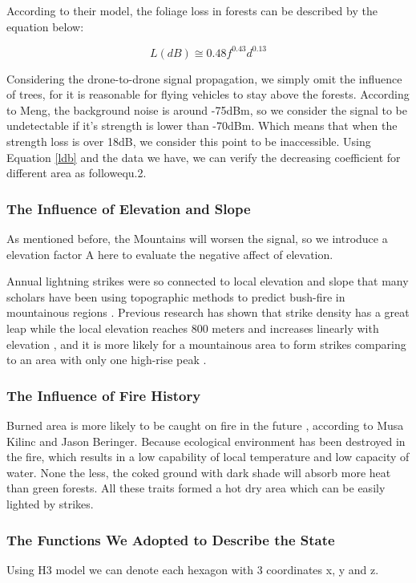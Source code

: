 \documentclass[13pt]{ctexart} %
\begin{document}
According to their model, the foliage loss in forests can be described by the equation below:

\begin{equation}\label{ldb}
    L(dB)\cong 0.48 f^{0.43} d^{0.13}
\end{equation}

Considering the drone-to-drone signal propagation, we simply omit the influence of trees, for it is reasonable for flying vehicles to stay above the forests. According to Meng, the background noise is around -75dBm, so we consider the signal to be undetectable if it's strength is lower than -70dBm. Which means that when the strength loss is over 18dB, we consider this point to be inaccessible. Using Equation \eqref{ldb} and the data we have, we can verify the decreasing coefficient for different area as follow{equ.2}.

\subsubsection{The Influence of Elevation and Slope}
As mentioned before, the Mountains will worsen the signal, so we introduce a elevation factor A here to evaluate the negative affect of elevation.

Annual lightning strikes were so connected to local elevation and slope that many scholars have been using topographic methods to predict bush-fire in mountainous regions \cite{Jiao-wildfire-cn}. Previous research has shown that strike density has a great leap while the local elevation reaches 800 meters and increases linearly with elevation \cite{Musa-lightning02}, and it is more likely for a mountainous area to form strikes comparing to an area with only one high-rise peak \cite{Jiao-wildfire-cn}.


\subsubsection{The Influence of Fire History}
Burned area is more likely to be caught on fire in the future \cite{Musa-lightning02}, according to Musa Kilinc and Jason Beringer. Because ecological environment has been destroyed in the fire, which results in a low capability of local temperature and low capacity of water. None the less, the coked ground with dark shade will absorb more heat than green forests. All these traits formed a hot dry area which can be easily lighted by strikes.

\subsubsection{The Functions We Adopted to Describe the State}
Using H3 model we can denote each hexagon with 3 coordinates x, y and z.
\end{document}

